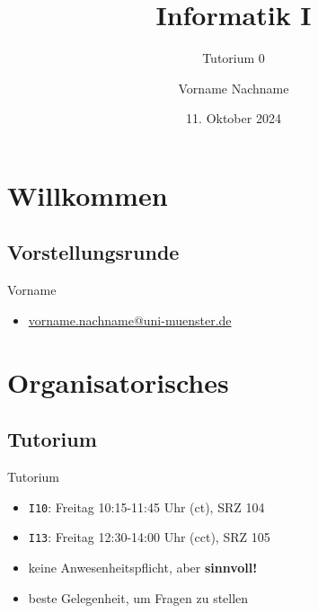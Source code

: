 \documentclass[aspectratio=169,usepdftitle=true,t]{beamer}
\title{Informatik I}
\subtitle{Tutorium 0}
\institute{Universität Münster}
\date{11. Oktober 2024}
\author{Vorname Nachname}
\begin{document}
\section{Willkommen}
\subsection{Vorstellungsrunde}

\begin{frame}{}
    \begin{block}{Vorname}
    \begin{itemize}
        \item \href{mailto:vorname.nachname@uni-muenster.de}{vorname.nachname@uni-muenster.de}
    \end{itemize}
    \end{block}
\end{frame}

\section{Organisatorisches}
\subsection{Tutorium}

\begin{frame}{Tutorium}
    \begin{itemize}
        \item<1-> \texttt{I10}: Freitag 10:15-11:45 Uhr (ct), SRZ 104
        \item<1-> \texttt{I13}: Freitag 12:30-14:00 Uhr (cct), SRZ 105
    \end{itemize}
    \vspace{\fill}
    \begin{itemize}
        \item<2-> keine Anwesenheitspflicht, aber \textbf{sinnvoll!}
        \item<2-> beste Gelegenheit, um Fragen zu stellen
    \end{itemize}
\end{frame}
\end{document}
